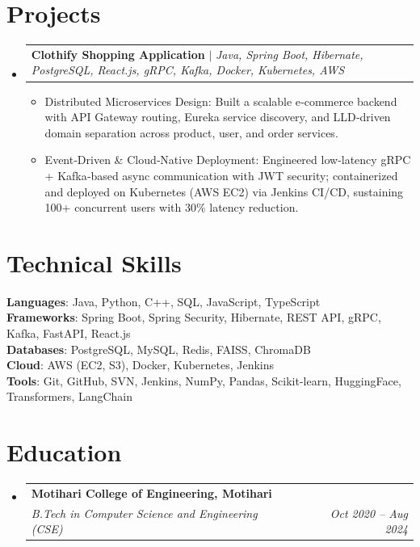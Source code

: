 \documentclass[10pt, letterpaper]{article}
\makeatletter
\newcommand{\resumeItem}[1]{
  \item\small{
    {#1 \vspace{-2pt}}
  }
}
\newcommand{\resumeSubheading}[4]{
  \vspace{-2pt}\item
    \begin{tabular*}{1.0\textwidth}[t]{l@{\extracolsep{\fill}}r}
      \textbf{#1} & \textbf{\small #2} \\
      \textit{\small#3} & \textit{\small #4} \\
    \end{tabular*}\vspace{-7pt}
}
\newcommand{\resumeProjectHeading}[2]{
    \item
    \begin{tabular*}{1.0\textwidth}{l@{\extracolsep{\fill}}r}
      \small#1 & \textbf{\small #2} \\
    \end{tabular*}\vspace{-7pt}
}
\newcommand{\resumeSubHeadingListStart}{\begin{itemize}[leftmargin=0.0in, label={}]}
\newcommand{\resumeSubHeadingListEnd}{\end{itemize}}
\newcommand{\resumeItemListStart}{\begin{itemize}[leftmargin=0.15in]}
\newcommand{\resumeItemListEnd}{\end{itemize}\vspace{-5pt}}
\makeatother
\begin{document}
\section{Projects}
\resumeSubHeadingListStart
  \resumeProjectHeading{\textbf{Clothify Shopping Application} $|$ \emph{Java, Spring Boot, Hibernate, PostgreSQL, React.js, gRPC, Kafka, Docker, Kubernetes, AWS}}{}
    \resumeItemListStart
      \resumeItem{Distributed Microservices Design: Built a scalable e‑commerce backend with API Gateway routing, Eureka service discovery, and LLD‑driven domain separation across product, user, and order services.}
      \resumeItem{Event‑Driven \& Cloud‑Native Deployment: Engineered low‑latency gRPC + Kafka‑based async communication with JWT security; containerized and deployed on Kubernetes (AWS EC2) via Jenkins CI/CD, sustaining 100+ concurrent users with 30\% latency reduction.}
    \resumeItemListEnd
\resumeSubHeadingListEnd


\section{Technical Skills}
\begin{itemize}[leftmargin=0.15in, label={}]
  \small{\item{
    \textbf{Languages}{: Java, Python, C++, SQL, JavaScript, TypeScript} \\
    \textbf{Frameworks}{: Spring Boot, Spring Security, Hibernate, REST API, gRPC, Kafka, FastAPI, React.js} \\
    \textbf{Databases}{: PostgreSQL, MySQL, Redis, FAISS, ChromaDB} \\
    \textbf{Cloud}{: AWS (EC2, S3), Docker, Kubernetes, Jenkins} \\
    \textbf{Tools}{: Git, GitHub, SVN, Jenkins, NumPy, Pandas, Scikit-learn, HuggingFace, Transformers, LangChain} \\
  }}
\end{itemize}


\section{Education}
\resumeSubHeadingListStart
  \resumeSubheading{Motihari College of Engineering, Motihari}{}{B.Tech in Computer Science and Engineering (CSE)}{Oct 2020 -- Aug 2024}
\resumeSubHeadingListEnd
\end{document}
